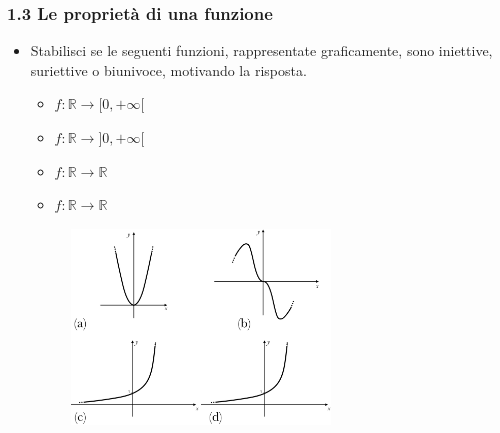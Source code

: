 \subsubsection*{1.3 Le proprietà di una funzione}
\begin{itemize}
  \item[1.6)] Stabilisci se le seguenti funzioni, rappresentate 
graficamente, sono iniettive, suriettive o biunivoce, motivando la risposta.
  \begin{multicols}{2} 
  \begin{itemize}
  \item[(a)] $f:\mathbb{R}\to[0,+\infty[$
  \item[(c)] $f:\mathbb{R}\to]0,+\infty[$
  \item[(b)] $f:\mathbb{R}\to\mathbb{R}$
  \item[(d)] $f:\mathbb{R}\to\mathbb{R}$
  \end{itemize}
  \end{multicols}
  
  \begin{figure}[htpb!]
  \centering
  
\includegraphics[width=0.65\textwidth]{img/funz_18.png}%
  \end{figure}
\end{itemize}
